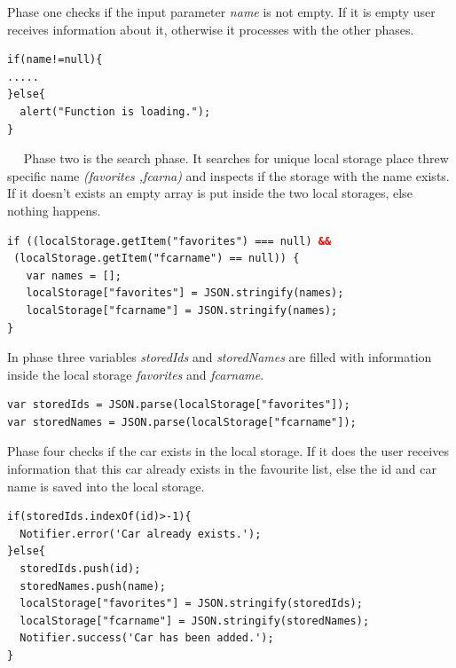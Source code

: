 Phase one checks if the input parameter \textit{name} is not empty. If it is empty user receives information about it, otherwise it processes with the other phases.

\begin{lstlisting}[language=html, caption= 
Phase one,captionpos=b]
if(name!=null){
.....
}else{
  alert("Function is loading.");
}
\end{lstlisting}
\
\
\newpage
Phase two is the search phase. It searches for unique local storage place threw specific name \textit{(favorites ,fcarna)} and inspects if the storage with the name exists. If it doesn't exists an empty array is put inside the two local storages, else nothing happens.
\\

\begin{lstlisting}[language=html, caption= 
Phase two,captionpos=b]
if ((localStorage.getItem("favorites") === null) &&
 (localStorage.getItem("fcarname") == null)) {
   var names = [];
   localStorage["favorites"] = JSON.stringify(names);	
   localStorage["fcarname"] = JSON.stringify(names);
}
\end{lstlisting}


In phase three variables \textit{storedIds} and \textit{storedNames} are filled with information inside the local storage \textit{favorites} and \textit{fcarname}.
\\

\begin{lstlisting}[language=html, caption= 
Phase three,captionpos=b]
var storedIds = JSON.parse(localStorage["favorites"]);
var storedNames = JSON.parse(localStorage["fcarname"]);
\end{lstlisting}

Phase four checks if the car exists in the local storage. If it does the user receives information that this car already exists in the favourite list, else the id and car name is saved into the local storage.
\\

\begin{lstlisting}[language=html, caption= 
Phase four,captionpos=b]
if(storedIds.indexOf(id)>-1){
  Notifier.error('Car already exists.');
}else{
  storedIds.push(id);
  storedNames.push(name);
  localStorage["favorites"] = JSON.stringify(storedIds);
  localStorage["fcarname"] = JSON.stringify(storedNames);
  Notifier.success('Car has been added.');
}
\end{lstlisting}

